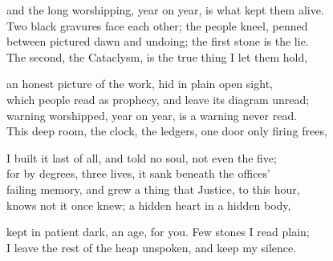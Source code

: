 \begin{founder}
and the long worshipping, year on year, is what kept them alive.\\
Two black gravures face each other; the people kneel, penned\\
between pictured dawn and undoing; the first stone is the lie.\\
The second, the Cataclysm, is the true thing I let them hold,\\
\medskip

an honest picture of the work, hid in plain open sight,\\
which people read as prophecy, and leave its diagram unread;\\
warning worshipped, year on year, is a warning never read.\\
This deep room, the clock, the ledgers, one door only firing frees,\\
\medskip

I built it last of all, and told no soul, not even the five;\\
for by degrees, three lives, it sank beneath the offices'\\
failing memory, and grew a thing that Justice, to this hour,\\
knows not it once knew; a hidden heart in a hidden body,\\
\medskip

kept in patient dark, an age, for you. Few stones I read plain;\\
I leave the rest of the heap unspoken, and keep my silence.
\end{founder}

\ornament

